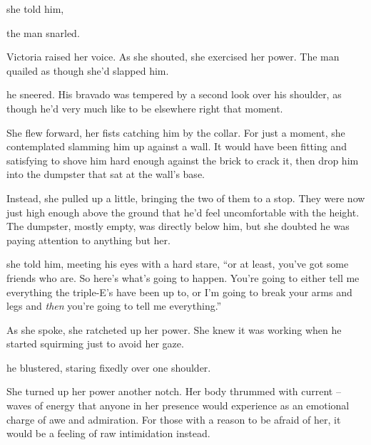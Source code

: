  she told him, 

 the man snarled.

 Victoria raised her voice. As she shouted, she exercised her power. The man quailed as though she'd slapped him. 

 he sneered. His bravado was tempered by a second look over his shoulder, as though he'd very much like to be elsewhere right that moment.

She flew forward, her fists catching him by the collar. For just a moment, she contemplated slamming him up against a wall. It would have been fitting and satisfying to shove him hard enough against the brick to crack it, then drop him into the dumpster that sat at the wall's base.

Instead, she pulled up a little, bringing the two of them to a stop. They were now just high enough above the ground that he'd feel uncomfortable with the height. The dumpster, mostly empty, was directly below him, but she doubted he was paying attention to anything but her.

 she told him, meeting his eyes with a hard stare, “or at least, you've got some friends who are. So here's what's going to happen. You're going to either tell me everything the triple-E's have been up to, or I'm going to break your arms and legs and {\em then} you're going to tell me everything.”

As she spoke, she ratcheted up her power. She knew it was working when he started squirming just to avoid her gaze.

 he blustered, staring fixedly over one shoulder.

She turned up her power another notch. Her body thrummed with current -- waves of energy that anyone in her presence would experience as an emotional charge of awe and admiration. For those with a reason to be afraid of her, it would be a feeling of raw intimidation instead.

